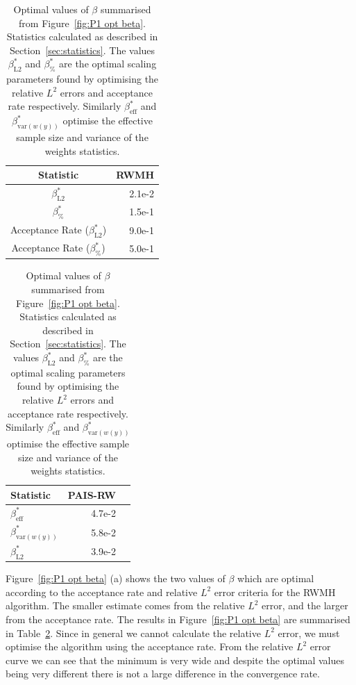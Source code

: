 \documentclass[final]{siamltex}
\begin{document}
\begin{table}[!htb]
    \begin{minipage}{.5\linewidth}
      \centering
        \begin{tabular}{|c|r|}
	\hline
	Statistic											& RWMH \\ \hline
	$\beta_{\text{L2}}^*$								& 2.1e-2 \\
	$\beta_{\%}^*$									& 1.5e-1 \\
	Acceptance Rate ($\beta_{\text{L2}}^*$)				& 9.0e-1 \\
	Acceptance Rate ($\beta_{\%}^*$)					& 5.0e-1 \\
	\hline
	\end{tabular}
    \end{minipage}%
    \begin{minipage}{.5\linewidth}
      \centering
        \begin{tabular}{|l|r|r|}
	\hline
	Statistic							& PAIS-RW \\ \hline
	$\beta_{\text{eff}}^*$				& 4.7e-2 \\
	$\beta_{\text{var}(w(y))}^*$		& 5.8e-2 \\
	$\beta_{\text{L2}}^*$				& 3.9e-2 \\
	\hline
	\end{tabular}
    \end{minipage}
	\vspace{1mm}
	\caption{Optimal values of $\beta$ summarised from Figure~\ref{fig:P1 opt beta}. Statistics calculated as described in Section~\ref{sec:statistics}. The values $\beta^*_{\text{L2}}$ and $\beta^*_{\%}$ are the optimal scaling parameters found by optimising the relative $L^2$ errors and acceptance rate respectively. Similarly $\beta_{\text{eff}}^*$ and $\beta_{\text{var}(w(y))}^*$ optimise the effective sample size and variance of the weights statistics.}
	\label{table:prob1 opt beta}
\end{table}

Figure~\ref{fig:P1 opt beta} (a) shows the two values of $\beta$ which
are optimal according to the acceptance rate and relative $L^2$ error
criteria for the RWMH algorithm. The smaller estimate comes from the
relative $L^2$ error, and the larger from the acceptance rate. The
results in Figure~\ref{fig:P1 opt beta} are summarised in
Table~\ref{table:prob1 opt beta}. Since in general we cannot calculate
the relative $L^2$ error, we must optimise the algorithm using the
acceptance rate. From the relative $L^2$ error curve we can see that
the minimum is very wide and despite the optimal values being very
different there is not a large difference in the convergence rate.
\end{document}
